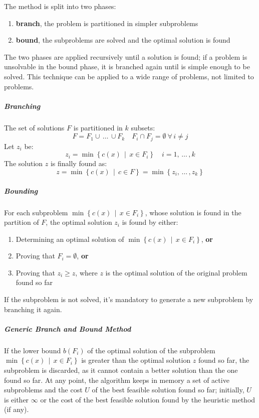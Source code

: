 \documentclass[english]{article}
\begin{document}
The method is split into two phases:

\begin{enumerate}[label=Phase \arabic*., ref=step \arabic*, leftmargin=*, widest*=8, labelindent=1em]
  \item \textbf{branch}, the problem is partitioned in simpler subproblems
  \item \textbf{bound}, the subproblems are solved and the optimal solution is found
\end{enumerate}

The two phases are applied recursively until a solution is found;
if a problem is unsolvable in the bound phase, it is branched again until is simple enough to be solved.
This technique can be applied to a wide range of problems, not limited to \ILP problems.

\subparagraph*{Branching}

The set of solutions \(F\) is partitioned in \(k\) subsets:
\[ F = F_1 \cup \, \ldots \, \cup F_k \quad F_i \cap F_j = \emptyset \ \forall \, i \neq j \]
Let \(z_i\) be:
\[ z_i = \min\left\{ c(x) \,\middle\vert\, x \in F_i \right\} \quad i = 1, \, \ldots \, , k \]
The solution \(z\) is finally found as:
\[ z = \min\left\{ c(x) \,\middle\vert\, c \in F \right\} = \min\left\{ z_i, \, \ldots \,, z_k \right\} \]

\subparagraph*{Bounding}

For each subproblem \(\min\left\{ c(x) \,\middle\vert\, x \in F_i \right\}\), whose solution is found in the partition of \(F\), the optimal solution \(z_i\) is found by either:

\begin{enumerate}
  \item Determining an optimal solution of \(\min\left\{ c(x) \,\middle\vert\, x \in F_i \right\}\), \textbf{or}
  \item Proving that \(F_i = \emptyset\), \textbf{or}
  \item Proving that \(z_i \geq z\), where \(z\) is the optimal solution of the original problem found so far
\end{enumerate}

If the subproblem is not solved, it's mandatory to generate a new subproblem by branching it again.

\subparagraph*{Generic Branch and Bound Method}

If the lower bound \(b(F_i)\) of the optimal solution of the subproblem \(\min\left\{ c(x) \,\middle\vert\, x \in F_i \right\}\) is greater than the optimal solution \(z\) found so far, the subproblem is discarded, as it cannot contain a better solution than the one found so far.
At any point, the algorithm keeps in memory a set of active subproblems and the cost \(U\) of the best feasible solution found so far;
initially, \(U\) is either \(\infty\) or the cost of the best feasible solution found by the heuristic method (if any).
\end{document}
